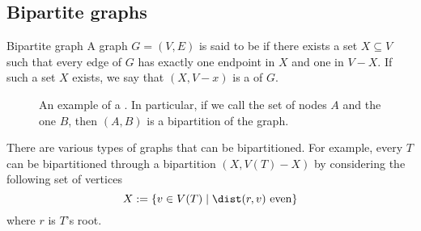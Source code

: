 \documentclass[a4paper, 12pt]{report}
\begin{document}
    \subsection{Bipartite graphs}

    \begin{frameddefn}{Bipartite graph}
        A graph $G = (V, E)$ is said to be  if there exists a set $X \subseteq V$ such that every edge of $G$ has exactly one endpoint in $X$ and one in $V - X$. If such a set $X$ exists, we say that $(X, V - x)$ is a  of $G$.
    \end{frameddefn}

    \begin{figure}[H]
        \centering
        \caption{An example of a . In particular, if we call the  set of nodes $A$ and the  one $B$, then $(A, B)$ is a bipartition of the graph.}
    \end{figure}

    There are various types of graphs that can be bipartitioned. For example, every  $T$ can be bipartitioned through a bipartition $(X, V(T) - X)$ by considering the following set of vertices $$X := \{v \in V(T) \mid \dist(r, v) \ \mathrm{even}\}$$ where $r$ is $T$'s root.
\end{document}
